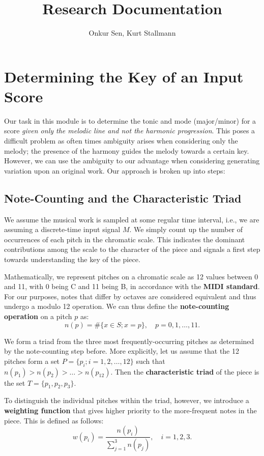 \documentclass[11pt]{article}
\title{Research Documentation}
\author{Onkur Sen, Kurt Stallmann}
\date{}
\begin{document}
\maketitle

\section{Determining the Key of an Input Score}
Our task in this module is to determine the tonic and mode (major/minor) for a score {\it given only the melodic line and not the harmonic progression}. This poses a difficult problem as often times ambiguity arises when considering only the melody; the presence of the harmony guides the melody towards a certain key. However, we can use the ambiguity to our advantage when considering generating variation upon an original work. Our approach is broken up into steps:

\subsection{Note-Counting and the Characteristic Triad}
We assume the musical work is sampled at some regular time interval, i.e., we are assuming a discrete-time input signal $M$. We simply count up the number of occurrences of each pitch in the chromatic scale. This indicates the dominant contributions among the scale to the character of the piece and signals a first step towards understanding the key of the piece.

Mathematically, we represent pitches on a chromatic scale as 12 values between 0 and 11, with 0 being C and 11 being B, in accordance with the {\bf MIDI standard}. For our purposes, notes that differ by octaves are considered equivalent and thus undergo a modulo 12 operation. We can thus define the {\bf note-counting operation} on a pitch $p$ as:
\[n(p) = \#\{x\in S; x = p\}, \quad p=0,1,\ldots,11. \]

We form a triad from the three most frequently-occurring pitches as determined by the note-counting step before. More explicitly, let us assume that the 12 pitches form a set $P=\{p_i; i = 1,2,\ldots,12\}$ such that $n(p_1)>n(p_2)>\ldots>n(p_{12})$. Then the {\bf characteristic triad} of the piece is the set $T=\{p_1, p_2, p_3\}$.

To distinguish the individual pitches within the triad, however, we introduce a {\bf weighting function} that gives higher priority to the more-frequent notes in the piece. This is defined as follows:
\[w(p_i) = \frac{n(p_i)}{\sum_{j=1}^3 n(p_j)}, \quad i = 1, 2, 3.\]
\end{document}
